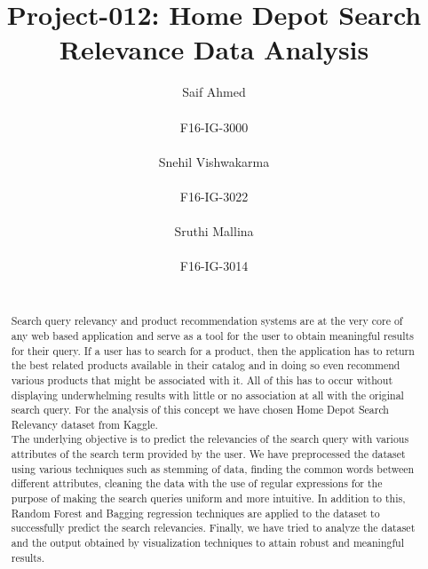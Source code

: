 \documentclass{sig-alternate-05-2015}
\begin{document}
\title{Project-012: Home Depot Search Relevance Data Analysis}

\author{
Saif Ahmed\\
        \\
        F16-IG-3000\\
        \\
\alignauthor
Snehil Vishwakarma\\
       \\
       F16-IG-3022\\
       \\
\alignauthor
Sruthi Mallina\\
       \\
       F16-IG-3014\\
       \\
}

\maketitle
\begin{abstract}
Search query relevancy and product recommendation systems are at the very core of any web based application and serve as a tool for the user to obtain meaningful results for their query. If a user has to search for a product, then the application has to return the best related products available in their catalog and in doing so even recommend various products that might be associated with it. All of this has to occur without displaying underwhelming results with little or no association at all with the original search query. For the analysis of this concept we have chosen Home Depot Search Relevancy dataset from Kaggle.\\
The underlying objective is to predict the relevancies of the search query with various attributes of the search term provided by the user. We have preprocessed the dataset using various techniques such as stemming of data, finding the common words between different attributes, cleaning the data with the use of regular expressions for the purpose of making the search queries uniform and more intuitive. In addition to this, Random Forest and Bagging regression techniques are applied to the dataset to successfully predict the search relevancies. Finally, we have tried to analyze the dataset and the output obtained by visualization techniques to attain robust and meaningful results.
\end{abstract}\\
\end{document}
